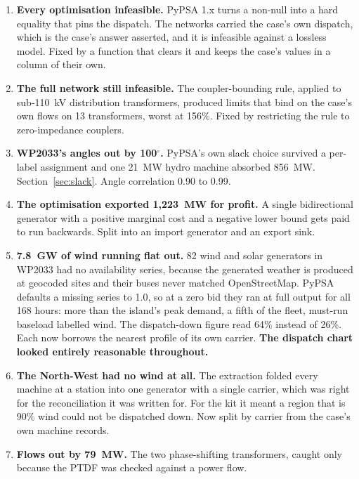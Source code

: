 \documentclass[11pt,a4paper]{article}
\begin{document}
\begin{enumerate}[leftmargin=1.5em]

\item \textbf{Every optimisation infeasible.} PyPSA 1.x turns a non-null
 into a hard equality that pins the dispatch. The networks carried
the case's own dispatch, which is the case's answer asserted, and it is
infeasible against a lossless model. Fixed by a function that clears it and
keeps the case's values in a column of their own.

\item \textbf{The full network still infeasible.} The coupler-bounding rule,
applied to sub-110~kV distribution transformers, produced limits that bind on
the case's own flows on 13 transformers, worst at 156\%. Fixed by restricting
the rule to zero-impedance couplers.

\item \textbf{WP2033's angles out by 100$^\circ$.} PyPSA's own slack choice
survived a per-label assignment and one 21~MW hydro machine absorbed 856~MW.
Section~\ref{sec:slack}. Angle correlation 0.90 to 0.99.

\item \textbf{The optimisation exported 1{,}223~MW for profit.} A single
bidirectional generator with a positive marginal cost and a negative lower
bound gets paid to run backwards. Split into an import generator and an export
sink.

\item \textbf{7.8~GW of wind running flat out.} 82 wind and solar generators in
WP2033 had no availability series, because the generated weather is produced at
geocoded sites and their buses never matched OpenStreetMap. PyPSA defaults a
missing series to 1.0, so at a zero bid they ran at full output for all 168
hours: more than the island's peak demand, a fifth of the fleet, must-run
baseload labelled wind. The dispatch-down figure read 64\% instead of 26\%. Each
now borrows the nearest profile of its own carrier. \textbf{The dispatch chart
looked entirely reasonable throughout.}

\item \textbf{The North-West had no wind at all.} The extraction folded every
machine at a station into one generator with a single carrier, which was right
for the reconciliation it was written for. For the kit it meant a region that
is 90\% wind could not be dispatched down. Now split by carrier from the case's own
machine records.

\item \textbf{Flows out by 79~MW.} The two phase-shifting transformers, caught
only because the PTDF was checked against a power flow.


\end{enumerate}
\end{document}
